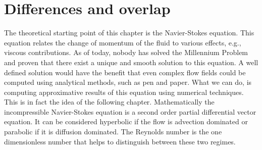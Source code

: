 \section{Differences and overlap}
\label{sec:shallow_to_thin}
The theoretical starting point of this chapter is the Navier-Stokes equation.
This equation relates the change of momentum of the fluid to various effects, e.g., viscous contributions. 
As of today, nobody has solved the Millennium Problem and proven that there exist a unique and smooth solution to this equation.
A well defined solution would have the benefit that even complex flow fields could be computed using analytical methods, such as pen and paper.
What we can do, is computing approximative results of this equation using numerical techniques.
This is in fact the idea of the following chapter.
Mathematically the incompressible Navier-Stokes equation is a second order partial differential vector equation. 
It can be considered hyperbolic if the flow is advection dominated or parabolic if it is diffusion dominated.
The Reynolds number is the one dimensionless number that helps to distinguish between these two regimes. 

